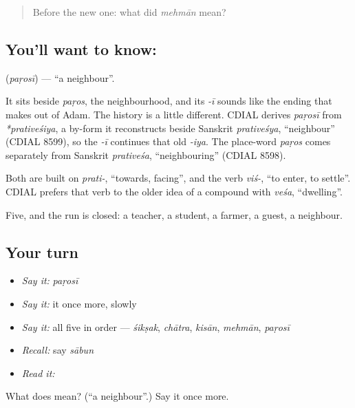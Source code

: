 \begin{quote}
Before the new one: what did \emph{mehmān} mean?
\end{quote}

\subsection*{You'll want to know: }
\textbf{} (\emph{paṛosī}) — \textquotedblleft{}a neighbour\textquotedblright{}.

It sits beside \emph{paṛos}, the neighbourhood, and its \emph{-ī} sounds like the ending that makes  out of Adam. The history is a little different. CDIAL derives \emph{paṛosī} from \emph{*prativeśiya}, a by-form it reconstructs beside Sanskrit \emph{prativeśya}, \textquotedblleft{}neighbour\textquotedblright{} (CDIAL 8599), so the \emph{-ī} continues that old \emph{-iya}. The place-word \emph{paṛos} comes separately from Sanskrit \emph{prativeśa}, \textquotedblleft{}neighbouring\textquotedblright{} (CDIAL 8598).

Both are built on \emph{prati-}, \textquotedblleft{}towards, facing\textquotedblright{}, and the verb \emph{viś-}, \textquotedblleft{}to enter, to settle\textquotedblright{}. CDIAL prefers that verb to the older idea of a compound with \emph{veśa}, \textquotedblleft{}dwelling\textquotedblright{}.

\begin{grammarlens}[title={What you've built}]
Five, and the run is closed: a teacher, a student, a farmer, a guest, a neighbour.
\end{grammarlens}

\subsection*{Your turn}
\begin{itemize}
\raggedright
  \item \emph{Say it:} \emph{paṛosī}
  \item \emph{Say it:} it once more, slowly
  \item \emph{Say it:} all five in order — \emph{śikṣak}, \emph{chātra}, \emph{kisān}, \emph{mehmān}, \emph{paṛosī}
  \item \emph{Recall:} say \emph{sābun}
  \item \emph{Read it:} \textbf{}
\end{itemize}

\begin{tcolorbox}[breakable,colback=teal!4,colframe=teal!35!black,title={Before you move on}]
What does  mean? (\textquotedblleft{}a neighbour\textquotedblright{}.) Say it once more.
\end{tcolorbox}
